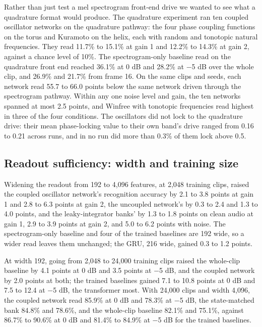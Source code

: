 \documentclass[10pt]{article}
\begin{document}
Rather than just test a mel spectrogram front-end drive we wanted to see
what a quadrature format would produce. The quadrature experiment ran
ten coupled oscillator networks on the quadrature pathway: the four
phase coupling functions on the torus and Kuramoto on the helix, each
with random and tonotopic natural frequencies. They read 11.7\% to
15.1\% at gain 1 and 12.2\% to 14.3\% at gain 2, against a chance level
of 10\%. The spectrogram-only baseline read on the quadrature front end
reached 36.1\% at 0 dB and 28.2\% at \ensuremath{-}5 dB over the whole
clip, and 26.9\% and 21.7\% from frame 16. On the same clips and seeds,
each network read 55.7 to 66.0 points below the same network driven
through the spectrogram pathway. Within any one noise level and gain,
the ten networks spanned at most 2.5 points, and Winfree with tonotopic
frequencies read highest in three of the four conditions. The
oscillators did not lock to the quadrature drive: their mean
phase-locking value to their own band's drive ranged from 0.16 to 0.21
across runs, and in no run did more than 0.3\% of them lock above 0.5.

\subsection{Readout sufficiency: width and training
size}\label{readout-sufficiency-width-and-training-size}

Widening the readout from 192 to 4,096 features, at 2,048 training
clips, raised the coupled oscillator network's recognition accuracy by
2.1 to 3.8 points at gain 1 and 2.8 to 6.3 points at gain 2, the
uncoupled network's by 0.3 to 2.4 and 1.3 to 4.0 points, and the
leaky-integrator banks' by 1.3 to 1.8 points on clean audio at gain 1,
2.9 to 3.9 points at gain 2, and 5.0 to 6.2 points with noise. The
spectrogram-only baseline and four of the trained baselines are 192
wide, so a wider read leaves them unchanged; the GRU, 216 wide, gained
0.3 to 1.2 points.

At width 192, going from 2,048 to 24,000 training clips raised the
whole-clip baseline by 4.1 points at 0 dB and 3.5 points at
\ensuremath{-}5 dB, and the coupled network by 2.0 points at both; the
trained baselines gained 7.1 to 10.8 points at 0 dB and 7.5 to 12.4 at
\ensuremath{-}5 dB, the transformer most. With 24,000 clips and width
4,096, the coupled network read 85.9\% at 0 dB and 78.3\% at
\ensuremath{-}5 dB, the state-matched bank 84.8\% and 78.6\%, and the
whole-clip baseline 82.1\% and 75.1\%, against 86.7\% to 90.6\% at 0 dB
and 81.4\% to 84.9\% at \ensuremath{-}5 dB for the trained baselines.
\end{document}
